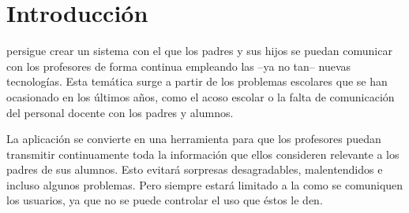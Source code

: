%
%
%
%

\cleardoublepage
\chapter{Introducción}
\label{chap:intorduction}

\CollegeApp persigue\cite{prueba:online} crear un sistema con el que los padres y sus hijos se puedan comunicar con los profesores de forma continua empleando las --ya no tan-- nuevas tecnologías. Esta temática surge a partir de los problemas escolares que se han ocasionado en los últimos años, como el acoso escolar o la falta de comunicación del personal docente con los padres y alumnos.

\bigskip
La aplicación se convierte en una herramienta para que los profesores puedan transmitir continuamente toda la información que ellos consideren relevante a los padres de sus alumnos. Esto evitará sorpresas desagradables, malentendidos e incluso algunos problemas.
Pero siempre estará limitado a la como se comuniquen los usuarios, ya que no se puede controlar el uso que éstos le den.

